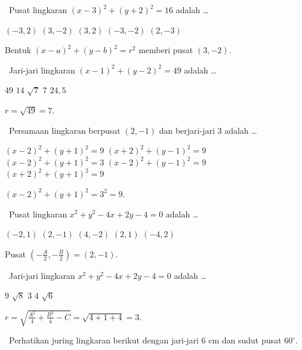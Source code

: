 \documentclass[11pt,a4paper]{exam}
\newcommand{\Fund}{{\footnotesize\textsf{\textcolor{hijau}{[Fundamental]}}}\ }
\newcommand{\Inter}{{\footnotesize\textsf{\textcolor{biru}{[Intermediate]}}}\ }
\begin{document}
\begin{questions}
\question \Fund Pusat lingkaran $(x-3)^{2}+(y+2)^{2}=16$ adalah \dots
\begin{choices}
\choice $(-3,2)$ \CorrectChoice $(3,-2)$ \choice $(3,2)$ \choice $(-3,-2)$ \choice $(2,-3)$
\end{choices}
\begin{solution}Bentuk $(x-a)^{2}+(y-b)^{2}=r^{2}$ memberi pusat $(3,-2).$\end{solution}

\question \Fund Jari-jari lingkaran $(x-1)^{2}+(y-2)^{2}=49$ adalah \dots
\begin{choices}
\choice $49$ \choice $14$ \choice $\sqrt{7}$ \CorrectChoice $7$ \choice $24{,}5$
\end{choices}
\begin{solution}$r=\sqrt{49}=7.$\end{solution}

\question \Inter Persamaan lingkaran berpusat $(2,-1)$ dan berjari-jari 3 adalah \dots
\begin{choices}
\CorrectChoice $(x-2)^{2}+(y+1)^{2}=9$
\choice $(x+2)^{2}+(y-1)^{2}=9$
\choice $(x-2)^{2}+(y+1)^{2}=3$
\choice $(x-2)^{2}+(y-1)^{2}=9$
\choice $(x+2)^{2}+(y+1)^{2}=9$
\end{choices}
\begin{solution}$(x-2)^{2}+(y+1)^{2}=3^{2}=9.$\end{solution}

\question \Inter Pusat lingkaran $x^{2}+y^{2}-4x+2y-4=0$ adalah \dots
\begin{choices}
\choice $(-2,1)$ \CorrectChoice $(2,-1)$ \choice $(4,-2)$ \choice $(2,1)$ \choice $(-4,2)$
\end{choices}
\begin{solution}Pusat $\left(-\tfrac{A}{2},-\tfrac{B}{2}\right)=\left(2,-1\right).$\end{solution}

\question \Inter Jari-jari lingkaran $x^{2}+y^{2}-4x+2y-4=0$ adalah \dots
\begin{choices}
\choice $9$ \choice $\sqrt{8}$ \CorrectChoice $3$ \choice $4$ \choice $\sqrt{6}$
\end{choices}
\begin{solution}$r=\sqrt{\tfrac{A^{2}}{4}+\tfrac{B^{2}}{4}-C}=\sqrt{4+1+4}=3.$\end{solution}

\question \Inter Perhatikan juring lingkaran berikut dengan jari-jari 6 cm dan
sudut pusat $60^\circ$.

\begin{center}
\end{center}


\end{questions}
\end{document}
